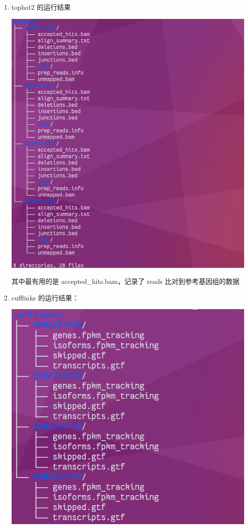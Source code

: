\documentclass[
  a4paper,
]{article}
\begin{document}
\begin{enumerate}
  \begin{enumerate}
  \def\labelenumii{\arabic{enumii}.}
  \item
    tophat2 的运行结果

    \includegraphics{assets/image-20220928193453-vtzwja0.png}\hspace{0pt}

    其中最有用的是 accepted\_hits.bam，记录了 reads
    比对到参考基因组的数据
  \item
    cufflinks 的运行结果：

    \includegraphics{assets/image-20220928192709-10579bp.png}\hspace{0pt}


\end{enumerate}
\end{enumerate}
\end{document}

